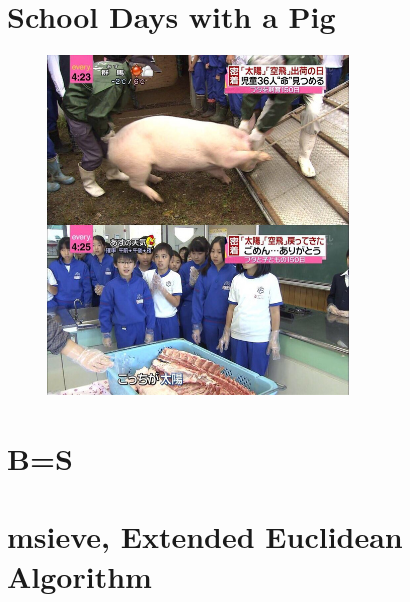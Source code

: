 \documentclass{jsarticle}
\begin{document}
\section{School Days with a Pig}
\begin{figure}[H]
	\begin{center}
		\includegraphics[clip, width=8.0cm]{./Hint3.jpg}
	\end{center}
\end{figure}

\section{B=S}
\section{msieve, Extended Euclidean Algorithm}
\end{document}
